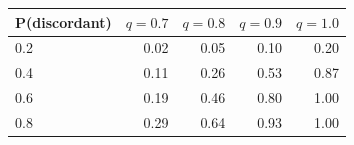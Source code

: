 \begin{tabular}{lrrrr}
\toprule
P(discordant) & $q=0.7$ & $q=0.8$ & $q=0.9$ & $q=1.0$ \\
\midrule
0.2 & 0.02 & 0.05 & 0.10 & 0.20 \\
0.4 & 0.11 & 0.26 & 0.53 & 0.87 \\
0.6 & 0.19 & 0.46 & 0.80 & 1.00 \\
0.8 & 0.29 & 0.64 & 0.93 & 1.00 \\
\bottomrule
\end{tabular}
